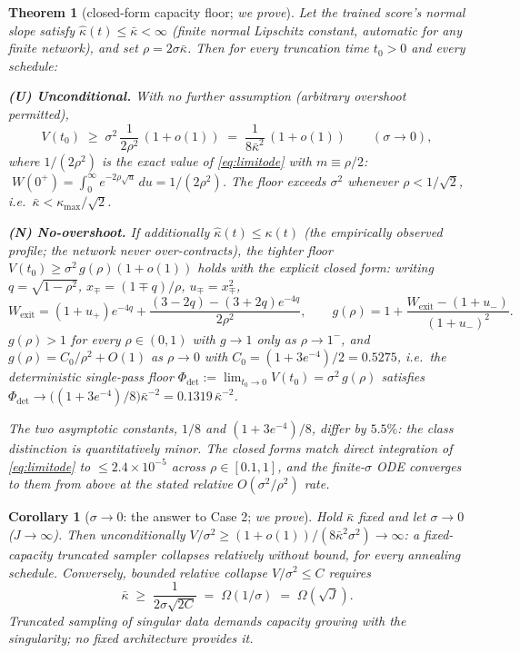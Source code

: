 \documentclass[11pt]{article}
\newtheorem{theorem}{Theorem}
\newtheorem{corollary}{Corollary}
\theoremstyle{remark}
\newcommand{\kb}{\bar\kappa}
\newcommand{\Phidet}{\Phi_{\mathrm{det}}}
\newcommand{\sigsq}{\sigma^2}
\begin{document}
\begin{theorem}[closed-form capacity floor; \emph{we prove}]\label{thm:floor}
Let the trained score's normal slope satisfy $\hat\kappa(t)\le\kb<\infty$
(finite normal Lipschitz constant, automatic for any finite network), and set
$\rho=2\sigma\kb$. Then for every truncation time $t_0>0$ and every schedule:

\textbf{(U) Unconditional.} With no further assumption (arbitrary overshoot permitted),
\begin{equation}
V(t_0)\;\ge\;\sigsq\,\frac{1}{2\rho^2}\,(1+o(1))
\;=\;\frac{1}{8\kb^2}\,(1+o(1)) \qquad(\sigma\to0),
\label{eq:uncond}
\end{equation}
where $1/(2\rho^2)$ is the \emph{exact} value of \eqref{eq:limitode} with $m\equiv\rho/2$:
$\;W(0^+)=\int_0^\infty e^{-2\rho\sqrt u}\,du=1/(2\rho^2)$. The floor exceeds $\sigsq$
whenever $\rho<1/\sqrt2$, i.e.\ $\kb<\kappa_{\max}/\sqrt2$.

\textbf{(N) No-overshoot.} If additionally $\hat\kappa(t)\le\kappa(t)$ (the empirically
observed profile; the network never over-contracts), the tighter floor
$V(t_0)\ge\sigsq\,g(\rho)(1+o(1))$ holds with the explicit closed form: writing
$q=\sqrt{1-\rho^2}$, $x_\mp=(1\mp q)/\rho$, $u_\mp=x_\mp^2$,
\begin{equation}
W_{\mathrm{exit}}=(1+u_+)e^{-4q}+\frac{(3-2q)-(3+2q)e^{-4q}}{2\rho^2},
\qquad
g(\rho)=1+\frac{W_{\mathrm{exit}}-(1+u_-)}{(1+u_-)^2} .
\label{eq:closedform}
\end{equation}
$g(\rho)>1$ for every $\rho\in(0,1)$ with $g\to1$ only as $\rho\to1^-$, and
$g(\rho)=C_0/\rho^2+O(1)$ as $\rho\to0$ with $C_0=(1+3e^{-4})/2=0.5275$, i.e.\ the
deterministic single-pass floor $\Phidet:=\lim_{t_0\to0}V(t_0)=\sigsq\,g(\rho)$
satisfies $\Phidet\to\big((1+3e^{-4})/8\big)\kb^{-2}=0.1319\,\kb^{-2}$.

The two asymptotic constants, $1/8$ and $(1+3e^{-4})/8$, differ by $5.5\%$: the class
distinction is quantitatively minor. The closed forms match direct integration of
\eqref{eq:limitode} to $\le2.4\times10^{-5}$ across $\rho\in[0.1,1]$, and the
finite-$\sigma$ ODE converges to them from above at the stated relative
$O(\sigsq/\rho^2)$ rate.
\end{theorem}

\begin{corollary}[$\sigma\to0$: the answer to Case 2; \emph{we prove}]\label{cor:capacity}
Hold $\kb$ fixed and let $\sigma\to0$ ($J\to\infty$). Then unconditionally
$V/\sigsq\ge(1+o(1))/(8\kb^2\sigsq)\to\infty$: a fixed-capacity truncated sampler
collapses \emph{relatively} without bound, for every annealing schedule. Conversely,
bounded relative collapse $V/\sigsq\le C$ requires
\begin{equation}
\kb\;\ge\;\frac{1}{2\sigma\sqrt{2C}}\;=\;\Omega(1/\sigma)\;=\;\Omega(\sqrt J).
\end{equation}
Truncated sampling of singular data demands capacity growing with the singularity;
no fixed architecture provides it.
\end{corollary}
\end{document}

